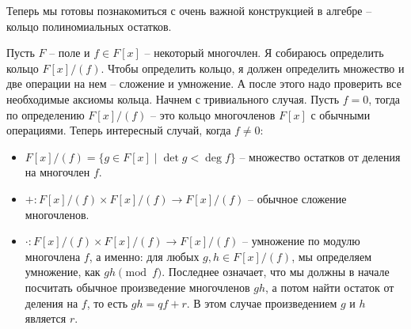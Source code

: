 Теперь мы готовы познакомиться с очень важной конструкцией в алгебре -- кольцо полиномиальных остатков.

Пусть $F$ -- поле и $f\in F[x]$ -- некоторый многочлен.
Я собираюсь определить кольцо $F[x]/(f)$.
Чтобы определить кольцо, я должен определить множество и две операции на нем -- сложение и умножение.
А после этого надо проверить все необходимые аксиомы кольца.
Начнем с тривиального случая.
Пусть $f = 0$, тогда по определению $F[x]/(f)$ -- это кольцо многочленов $F[x]$ с обычными операциями.
Теперь интересный случай, когда $f \neq 0$:
\begin{itemize}
\item $F[x]/(f) = \{g \in F[x]\mid \det g < \deg f\}$ -- множество остатков от деления на многочлен $f$.

\item $+\colon F[x]/(f)\times F[x]/(f) \to F[x]/(f)$ -- обычное сложение многочленов.

\item $\cdot \colon F[x]/(f)\times F[x]/(f) \to F[x]/(f)$ -- умножение по модулю многочлена $f$, а именно: для любых $g, h\in F[x]/(f)$, мы определяем умножение, как  $gh \pmod{f}$.
Последнее означает, что мы должны в начале посчитать обычное произведение многочленов $gh$, а потом найти остаток от деления на $f$, то есть $gh = q f + r$.
В этом случае произведением $g$ и  $h$ является $r$.
\end{itemize}

